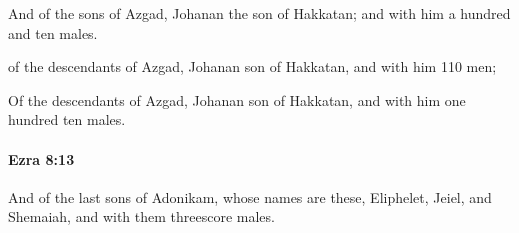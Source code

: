 			\begin{versebox}
					\item[BHS] 
					\item[LXX] 
					\item[ASV] And of the sons of Azgad, Johanan the son of Hakkatan; and with him a hundred and ten males.
					\item[NIV] of the descendants of Azgad, Johanan son of Hakkatan, and with him 110 men;
					\item[NRSV] Of the descendants of Azgad, Johanan son of Hakkatan, and with him one hundred ten males.
			\end{versebox}

		\paragraph{Ezra 8:13} %
			\label{EZRA-8-13}

			And of the last sons of Adonikam, whose names are these, Eliphelet, Jeiel, and Shemaiah, and with them threescore males.

